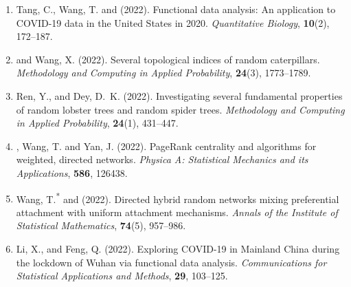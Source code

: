 \begin{enumerate}[resume=journalpubs]

\item\begin{pubentry} Tang, C., Wang, T. and \PZ{} (2022). Functional data analysis: An application to COVID-19 data in the United States in 2020. \emph{Quantitative Biology}, \textbf{10}(2), 172--187.

\par\end{pubentry}
\item\begin{pubentry} \PZ{} and Wang, X. (2022). Several topological indices of random caterpillars. \emph{Methodology and Computing in Applied Probability}, \textbf{24}(3), 1773--1789.

\par\end{pubentry}
\item\begin{pubentry} Ren, Y., \PZ{} and Dey, D.\ K. (2022). Investigating several fundamental properties of random lobster trees and random spider trees. \emph{Methodology and Computing in Applied Probability}, \textbf{24}(1), 431--447.

\par\end{pubentry}
\item\begin{pubentry} \PZ{}, Wang, T. and Yan, J. (2022). PageRank centrality and algorithms for weighted, directed networks. \emph{Physica A: Statistical Mechanics and its Applications}, \textbf{586}, 126438.

\par\end{pubentry}
\item\begin{pubentry} Wang, T.\textsuperscript{*} and \PZnot{} (2022). Directed hybrid random networks mixing preferential attachment with uniform attachment mechanisms. \emph{Annals of the Institute of Statistical Mathematics}, \textbf{74}(5), 957--986.

\par\end{pubentry}
\item\begin{pubentry} Li, X., \PZ{} and Feng, Q. (2022). Exploring COVID-19 in Mainland China during the lockdown of Wuhan via functional data analysis. \emph{Communications for Statistical Applications and Methods}, \textbf{29}, 103--125.


\end{pubentry}
\end{enumerate}
